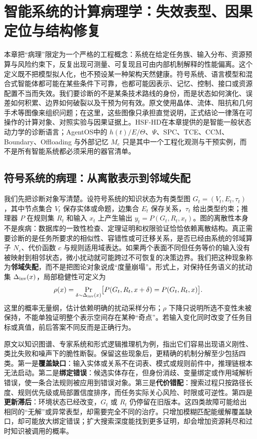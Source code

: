 \chapter{智能系统的计算病理学：失效表型、因果定位与结构修复}
\label{chp:pathological_diagnosis}

本章把“病理”限定为一个严格的工程概念：系统在给定任务族、输入分布、资源预算与风险约束下，反复出现可测量、可复现且可由内部机制解释的性能偏离。这个定义既不把模型拟人化，也不预设某一种架构天然健康。符号系统、语言模型和混合式智能体都可能在某些条件下可靠，也都可能因表示、记忆、控制、接口或资源配置不当而失效。我们要诊断的不是某条技术路线的身份，而是状态如何演化、误差如何积累、边界如何破裂以及干预为何有效。原文使用晶体、流体、阻抗和几何手术等图像来组织问题；在这里，这些图像只承担直觉说明，正式结论一律落在可操作的计算对象、对照实验与因果证据上。HSF-HD在本章提供的是智能一般状态动力学的诊断语言；AgentOS中的 \(h(t)/E/\Theta\)、\(\Psi\)、SPC、TCE、CCM、Boundary、Offloading 与外部记忆 \(M_e\) 只是其中一个工程化观测与干预实例，而不是所有智能系统都必须采用的器官清单。

\section{符号系统的病理：从离散表示到邻域失配}
\label{sec:section_5387}

我们先把诊断对象写清楚。设符号系统的知识状态为有类型图 \(G_t=(V_t,E_t,\tau_t)\)，其中节点集合 \(V_t\) 保存实体或命题，边集合 \(E_t\) 保存关系，\(\tau_t\) 给出类型约束；推理器 \(P\) 在规则集 \(R_t\) 和输入 \(x_t\) 上产生输出 \(y_t=P(G_t,R_t,x_t)\)。图的离散性本身不是疾病：数据库的一致性检查、定理证明和权限验证恰恰依赖离散结构。真正需要诊断的是任务所要求的相似性、容错性或可迁移关系，是否已经由系统的邻域算子 \(N_\varepsilon\)、代价函数 \(c\) 与规则适用域表达。如果两个表面不同但任务等价的输入没有被映射到相邻状态，微小扰动就可能跨过不可恢复的决策边界。我们把这种现象称为\textbf{邻域失配}，而不是把图论对象说成“度量崩塌”。形式上，对保持任务语义的扰动集 \(\Delta_{\rm inv}(x)\)，局部稳健性可定义为
\[
  \rho(x)=
  \Pr_{\delta\sim \Delta_{\rm inv}(x)}
  \bigl[P(G_t,R_t,x+\delta)=P(G_t,R_t,x)\bigr].
\]
这里的概率无量纲，估计依赖明确的扰动采样分布；\(\rho\) 下降只说明所选不变性未被保持，不能单独证明整个表示空间存在某种“奇点”。若输入变化同时改变了任务目标或真值，前后答案不同反而是正确行为。

原文以知识图谱、专家系统和形式逻辑推理机为例，指出它们容易出现语义刚性、类比失败和噪声下的脆性断裂。保留这些现象后，更精确的机制分解至少包括四类。第一是\textbf{覆盖缺口}：输入实体或关系不在词表、模式或规则前件中，推理链根本无法启动。第二是\textbf{绑定错误}：候选实体存在，但身份消歧、变量绑定或作用域解析错误，使一条合法规则被应用到错误对象。第三是\textbf{代价错配}：搜索过程只按路径长度、规则优先级或局部置信度排序，而任务实际关心风险、时限或可逆性。第四是\textbf{更新滞后}：环境状态已经改变，\(G_t\) 或 \(R_t\) 仍停留在旧版本。这四类故障可能给出相同的“无解”或异常表型，却需要完全不同的治疗。只增加模糊匹配能缓解覆盖缺口，却可能放大绑定错误；扩大搜索深度能找到更多证明，却会增加资源耗尽和过时知识被调用的概率。

